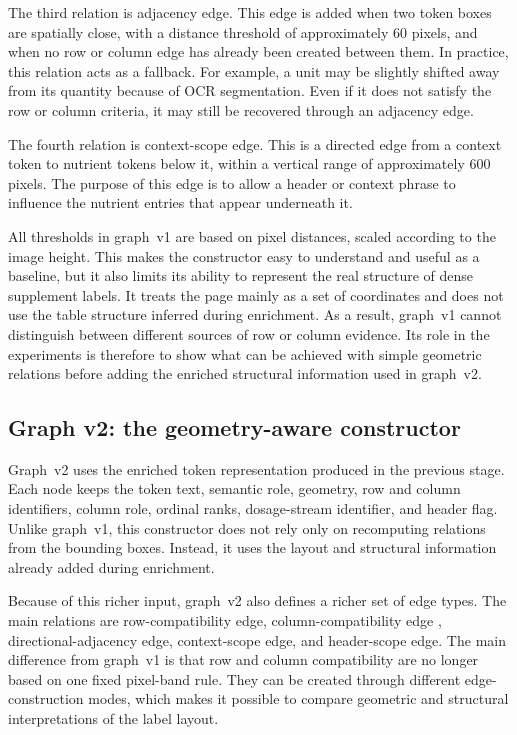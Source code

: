 The third relation is  adjacency edge. This edge is added when two token boxes are spatially close, with a distance threshold of approximately \(60\) pixels, and when no row or column edge has already been created between them. In practice, this relation acts as a fallback. For example, a unit may be slightly shifted away from its quantity because of OCR segmentation. Even if it does not satisfy the row or column criteria, it may still be recovered through an adjacency edge.

The fourth relation is context-scope edge. This is a directed edge from a context token to nutrient tokens below it, within a vertical range of approximately \(600\) pixels. The purpose of this edge is to allow a header or context phrase to influence the nutrient entries that appear underneath it.

All thresholds in graph~v1 are based on pixel distances, scaled according to the image height. This makes the constructor easy to understand and useful as a baseline, but it also limits its ability to represent the real structure of dense supplement labels. It treats the page mainly as a set of coordinates and does not use the table structure inferred during enrichment. As a result, graph~v1 cannot distinguish between different sources of row or column evidence. Its role in the experiments is therefore to show what can be achieved with simple geometric relations before adding the enriched structural information used in graph~v2.

\subsection{Graph v2: the geometry-aware constructor}\label{sec:graph-v2}

Graph~v2 uses the enriched token representation produced in the previous stage. Each node keeps the token text, semantic role, geometry, row and column identifiers, column role, ordinal ranks, dosage-stream identifier, and header flag. Unlike graph~v1, this constructor does not rely only on recomputing relations from the bounding boxes. Instead, it uses the layout and structural information already added during enrichment.

Because of this richer input, graph~v2 also defines a richer set of edge types. The main relations are  row-compatibility edge,  column-compatibility edge , directional-adjacency edge, context-scope edge, and header-scope edge. The main difference from graph~v1 is that row and column compatibility are no longer based on one fixed pixel-band rule. They can be created through different edge-construction modes, which makes it possible to compare geometric and structural interpretations of the label layout.

